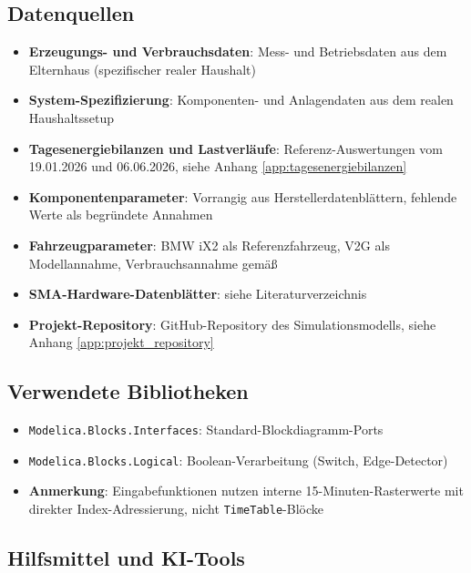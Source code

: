 \documentclass[conference]{IEEEtran}
\begin{document}
\subsection{Datenquellen}

\begin{itemize}
\item \textbf{Erzeugungs- und Verbrauchsdaten}: Mess- und Betriebsdaten aus dem Elternhaus (spezifischer realer Haushalt)
\item \textbf{System-Spezifizierung}: Komponenten- und Anlagendaten aus dem realen Haushaltssetup
\item \textbf{Tagesenergiebilanzen und Lastverläufe}: Referenz-Auswertungen vom 19.01.2026 und 06.06.2026, siehe Anhang \ref{app:tagesenergiebilanzen}
\item \textbf{Komponentenparameter}: Vorrangig aus Herstellerdatenblättern, fehlende Werte als begründete Annahmen
\item \textbf{Fahrzeugparameter}: BMW iX2 als Referenzfahrzeug, V2G als Modellannahme, Verbrauchsannahme gemäß \cite{BMW_iX2_AT}
\item \textbf{SMA-Hardware-Datenblätter}: siehe Literaturverzeichnis \cite{SMA_HM20_DS,SMA_SBS25_DS,SMA_STP810_DS,SMA_EVC_DS}
\item \textbf{Projekt-Repository}: GitHub-Repository des Simulationsmodells, siehe Anhang \ref{app:projekt_repository}
\end{itemize}

\subsection{Verwendete Bibliotheken}

\begin{itemize}
\item \texttt{Modelica.Blocks.Interfaces}: Standard-Blockdiagramm-Ports
\item \texttt{Modelica.Blocks.Logical}: Boolean-Verarbeitung (Switch, Edge-Detector)
\item \textbf{Anmerkung}: Eingabefunktionen nutzen interne 15-Minuten-Rasterwerte mit direkter Index-Adressierung, nicht \texttt{TimeTable}-Blöcke
\end{itemize}

\subsection{Hilfsmittel und KI-Tools}
\end{document}
